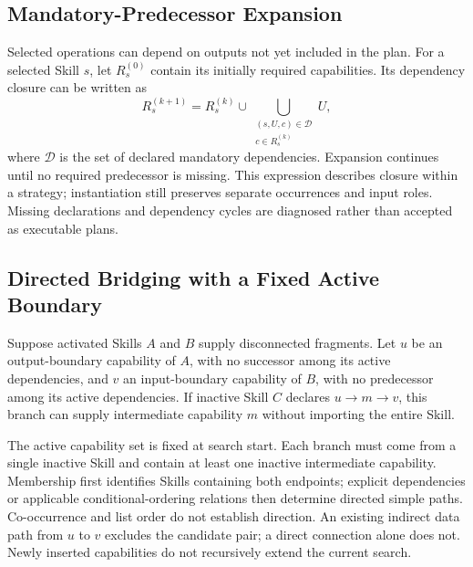 \subsection{Mandatory-Predecessor Expansion}
Selected operations can depend on outputs not yet included in the plan. For a selected Skill $s$, let $R_s^{(0)}$ contain its initially required capabilities. Its dependency closure can be written as
\begin{equation}
R_s^{(k+1)}
=
R_s^{(k)}
\cup
\bigcup_{\substack{(s,U,c)\in\mathcal{D}\\c\in R_s^{(k)}}} U,
\label{eq:closure}
\end{equation}
where $\mathcal{D}$ is the set of declared mandatory dependencies. Expansion continues until no required predecessor is missing. This expression describes closure within a strategy; instantiation still preserves separate occurrences and input roles. Missing declarations and dependency cycles are diagnosed rather than accepted as executable plans.



\subsection{Directed Bridging with a Fixed Active Boundary}
Suppose activated Skills $A$ and $B$ supply disconnected fragments. Let $u$ be an output-boundary capability of $A$, with no successor among its active dependencies, and $v$ an input-boundary capability of $B$, with no predecessor among its active dependencies. If inactive Skill $C$ declares $u\to m\to v$, this branch can supply intermediate capability $m$ without importing the entire Skill.

The active capability set is fixed at search start. Each branch must come from a single inactive Skill and contain at least one inactive intermediate capability. Membership first identifies Skills containing both endpoints; explicit dependencies or applicable conditional-ordering relations then determine directed simple paths. Co-occurrence and list order do not establish direction. An existing indirect data path from $u$ to $v$ excludes the candidate pair; a direct connection alone does not. Newly inserted capabilities do not recursively extend the current search.

